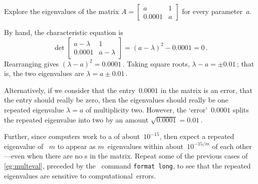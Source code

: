 \begin{example} \label{eg:}
Explore the eigenvalues of the matrix
\(A=\begin{bmatrix} a&1\\0.0001&a \end{bmatrix}\) for every parameter~\(a\).
\begin{solution} 
By hand, the characteristic equation is
\begin{equation*}
\det\begin{bmatrix} a-\lambda&1\\0.0001&a-\lambda \end{bmatrix}
=(a-\lambda)^2-0.0001=0\,.
\end{equation*}
Rearranging gives \((\lambda-a)^2=0.0001\)\,.
Taking square roots, \(\lambda-a=\pm0.01\)\,; that is, the two eigenvalues are \(\lambda=a\pm0.01\)\,.

Alternatively, if we consider that the entry~\(0.0001\) in the matrix is an error, that the entry should really be zero, then the eigenvalues should really be one repeated eigenvalue \(\lambda=a\) of multiplicity two.
However, the `error'~\(0.0001\) splits the repeated eigenvalue into two by an amount \(\sqrt{0.0001}=0.01\)\,.
\end{solution}
\end{example}


Further, since computers work to a  of about~\(10^{-15}\), then expect a repeated eigenvalue of ~\(m\) to appear as \(m\)~eigenvalues within about~\(10^{-15/m}\) of each other---even when there are no s in the matrix.
Repeat some of the previous cases of \autoref{eg:multeval}, preceded by the \script\ command \verb|format long|, to see that the repeated eigenvalues are sensitive to computational~errors.



